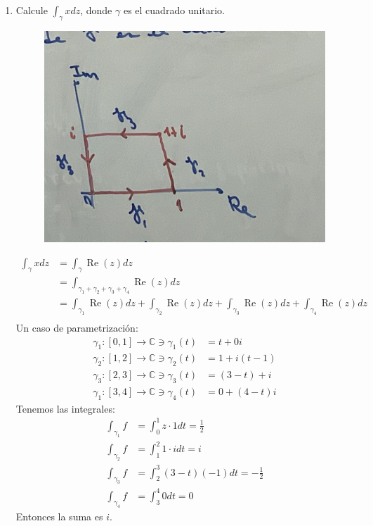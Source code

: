 \begin{ejemplo}
    \begin{enumerate}
        \item Calcule $\int_\gamma xdz$, donde $\gamma$ es el cuadrado unitario.
        \begin{figure}[H]
            \centering
            \includegraphics[scale=0.1]{imagenes/8-25-1.jpeg}
        \end{figure}
        \begin{align*}
            \int_\gamma xdz &=\int_\gamma \operatorname{Re}(z)dz\\
            &=\int_{\gamma_1+\gamma_2+\gamma_3+\gamma_4} \operatorname{Re}(z)dz\\
            &=\int_{\gamma_1} \operatorname{Re}(z)dz+\int_{\gamma_2} \operatorname{Re}(z)dz+\int_{\gamma_3} \operatorname{Re}(z)dz+\int_{\gamma_4} \operatorname{Re}(z)dz\\
        \end{align*} 
        Un caso de parametrización: 
        \begin{align*}
            \gamma_1:[0,1]\to \mathbb{C}\ni \gamma_1(t) &= t+0i\\
            \gamma_2:[1,2]\to \mathbb{C}\ni \gamma_2(t) &= 1+i(t-1)\\
            \gamma_3:[2,3]\to \mathbb{C}\ni \gamma_3(t) &= (3-t)+i\\
            \gamma_1:[3,4]\to \mathbb{C}\ni \gamma_4(t) &= 0+(4-t)i
        \end{align*}
        Tenemos las integrales:
        \begin{align*}
            \int_{\gamma_1}f &=\int_0^1 z\cdot 1 dt = \frac{1}{2}\\
            \int_{\gamma_2}f &= \int_1^2 1\cdot i dt = i\\
            \int_{\gamma_3}f &= \int_2^3 (3-t)(-1)dt = -\frac{1}{2}\\
            \int_{\gamma_4}f &=\int_3^4 0dt=0
        \end{align*}
        Entonces la suma es $i$. 
    \end{enumerate}
\end{ejemplo}

